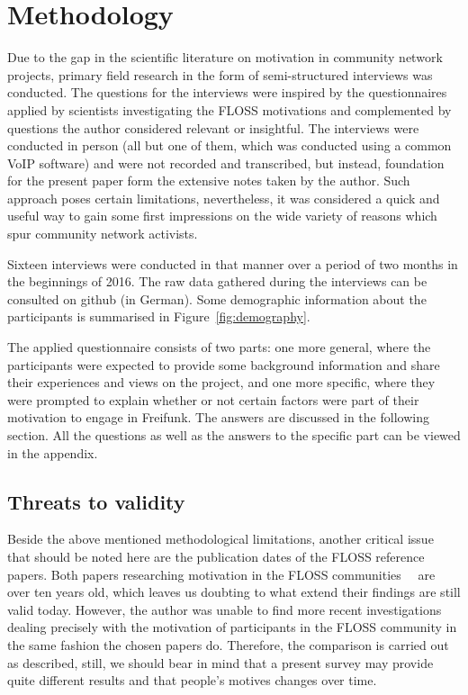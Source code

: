 \documentclass{scrartcl}
\begin{document}
\section{Methodology}

Due to the gap in the scientific literature on motivation in community network projects, primary field research in the form of semi-structured interviews was conducted.
The questions for the interviews were inspired by the questionnaires applied by scientists investigating the FLOSS motivations\cite{HarOu2002}\cite{LakWo2005} and complemented by questions the author considered relevant or insightful.
The interviews were conducted in person (all but one of them, which was conducted using a common VoIP software) and were not recorded and transcribed, but instead, foundation for the present paper form the extensive notes taken by the author.
Such approach poses certain limitations, nevertheless, it was considered a quick and useful way to gain some first impressions on the wide variety of reasons which spur community network activists.

Sixteen interviews were conducted in that manner over a period of two months in the beginnings of 2016.
The raw data gathered during the interviews can be consulted on github\cite{FFInterviews} (in German).
Some demographic information about the participants is summarised in Figure~\ref{fig:demography}.

The applied questionnaire consists of two parts: one more general, where the participants were expected to provide some background information and share their experiences and views on the project, and one more specific, where they were prompted to explain whether or not certain factors were part of their motivation to engage in Freifunk.
The answers are discussed in the following section.
All the questions as well as the answers to the specific part can be viewed in the appendix.

\subsection{Threats to validity}
Beside the above mentioned methodological limitations,
another critical issue that should be noted here are the publication dates of the FLOSS reference papers.
Both papers researching motivation in the FLOSS communities~\cite{HarOu2002}~\cite{LakWo2005} are over ten years old, which leaves us doubting to what extend their findings are still valid today.
However, the author was unable to find more recent investigations dealing precisely with the motivation of participants in the FLOSS community in the same fashion the chosen papers do.
Therefore, the comparison is carried out as described, still, we should bear in mind that a present survey may provide quite different results and that people's motives changes over time.
\\
\end{document}
